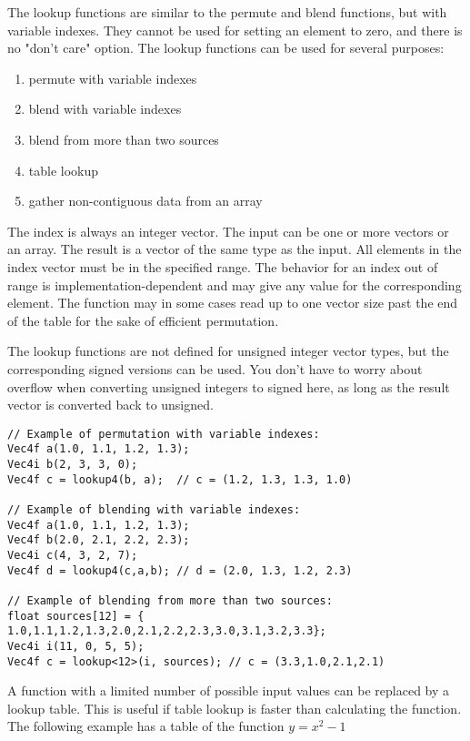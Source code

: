 \documentclass[vcl_manual.tex]{subfiles}
\begin{document}
The lookup functions are similar to the permute and blend functions, but with variable indexes. They cannot be used for setting an element to zero, and there is no "don't care" option. The lookup functions can be used for several purposes:

\begin{enumerate}
\item permute with variable indexes
\item blend with variable indexes
\item blend from more than two sources
\item table lookup
\item gather non-contiguous data from an array
\end{enumerate}

The index is always an integer vector. The input can be one or more vectors or an array. The result is a vector of the same type as the input. All elements in the index vector must be in the specified range. The behavior for an index out of range is implementation-dependent and may give any value for the corresponding element. The function may in some cases read up to one vector size past the end of the table for the sake of efficient permutation.

The lookup functions are not defined for unsigned integer vector types, but the corresponding signed versions can be used. You don't have to worry about overflow when converting unsigned integers to signed here, as long as the result vector is converted back to unsigned.


\begin{lstlisting}[frame=none]
// Example of permutation with variable indexes:
Vec4f a(1.0, 1.1, 1.2, 1.3);
Vec4i b(2, 3, 3, 0);
Vec4f c = lookup4(b, a);  // c = (1.2, 1.3, 1.3, 1.0)

// Example of blending with variable indexes:
Vec4f a(1.0, 1.1, 1.2, 1.3);
Vec4f b(2.0, 2.1, 2.2, 2.3);
Vec4i c(4, 3, 2, 7);
Vec4f d = lookup4(c,a,b); // d = (2.0, 1.3, 1.2, 2.3)

// Example of blending from more than two sources:
float sources[12] = {
1.0,1.1,1.2,1.3,2.0,2.1,2.2,2.3,3.0,3.1,3.2,3.3};
Vec4i i(11, 0, 5, 5);
Vec4f c = lookup<12>(i, sources); // c = (3.3,1.0,2.1,2.1)
\end{lstlisting}


A function with a limited number of possible input values can be replaced by a lookup table. This is useful if table lookup is faster than calculating the function. The following example has a table of the function $y = x^2 - 1$
\end{document}

